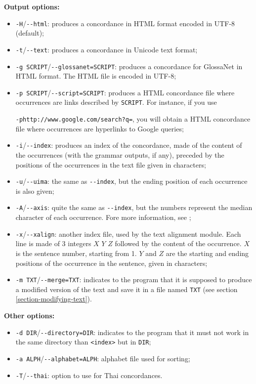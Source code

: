 \bigskip
\noindent \textbf{Output options:}
\begin{itemize}
  \item \verb+-H+/\verb+--html+: produces a concordance in HTML format encoded in
    UTF-8 (default);
  \item \verb+-t+/\verb+--text+: produces a concordance in Unicode text format; 
  \item \verb+-g SCRIPT+/\verb+--glossanet=SCRIPT+: produces a concordance for GlossaNet
  in HTML format. The HTML file is encoded in UTF-8;

  \item \verb+-p SCRIPT+/\verb+--script=SCRIPT+: produces a HTML concordance
  file where occurrences are links described by \verb+SCRIPT+. For instance, if
  you use
  
  \verb$-phttp://www.google.com/search?q=$, you will obtain
  a HTML concordance file where occurrences are hyperlinks to Google queries;

  \item \verb+-i+/\verb+--index+: produces an index of the concordance, made of the
    content of the occurrences (with the grammar outputs, if any), preceded by
    the positions of the occurrences in the text file given in characters;
  \item \verb+-u+/\verb+--uima+: the same as \verb+--index+, but the ending
  position of each occurrence is also given;
  \item \verb+-A+/\verb+--axis+: quite the same as \verb+--index+, but the numbers
    represent the median character of each occurrence. Fore more information,
    see \cite{axis};
  \item \verb+-x+/\verb+--xalign+: another index file, used by the text alignment module.
    Each line is made of 3 integers $X$ $Y$ $Z$ followed by the content of the 
    occurrence. $X$ is the sentence number, starting from 1. $Y$ and $Z$ are the
    starting and ending positions of the occurrence in the sentence, given in
    characters;
  \item \verb+-m TXT+/\verb+--merge=TXT+: indicates to the program that it is supposed to
    produce a modified version of the text and save it in a file named
    \verb+TXT+ (see section \ref{section-modifying-text}).
\end{itemize}

\bigskip
\noindent \textbf{Other options:}
\begin{itemize}
  \item \verb+-d DIR+/\verb+--directory=DIR+: indicates to the program that
  it must not work in the same directory than \verb+<index>+ but in \verb+DIR+;
  \item \verb+-a ALPH+/\verb+--alphabet=ALPH+: alphabet file used for sorting;
  \item \verb+-T+/\verb+--thai+: option to use for Thai concordances.
\end{itemize}

